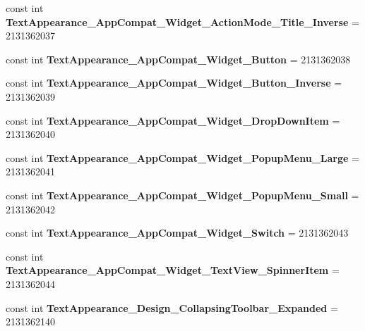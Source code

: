 \begin{DoxyCompactItemize}
const int {\bfseries Text\+Appearance\+\_\+\+App\+Compat\+\_\+\+Widget\+\_\+\+Action\+Mode\+\_\+\+Title\+\_\+\+Inverse} = 2131362037
\item 
\mbox{\label{classXaria_1_1Resource_1_1Style_a060ee91d0a7308724e62e1016d17e5c8}} 
const int {\bfseries Text\+Appearance\+\_\+\+App\+Compat\+\_\+\+Widget\+\_\+\+Button} = 2131362038
\item 
\mbox{\label{classXaria_1_1Resource_1_1Style_a6f68e5bce5f16e1d145c5e2c47e60304}} 
const int {\bfseries Text\+Appearance\+\_\+\+App\+Compat\+\_\+\+Widget\+\_\+\+Button\+\_\+\+Inverse} = 2131362039
\item 
\mbox{\label{classXaria_1_1Resource_1_1Style_afdb474a39f85c1ed8ecae8a5fab4febe}} 
const int {\bfseries Text\+Appearance\+\_\+\+App\+Compat\+\_\+\+Widget\+\_\+\+Drop\+Down\+Item} = 2131362040
\item 
\mbox{\label{classXaria_1_1Resource_1_1Style_ab780d03ea6f90f6f473100dbf3c7f823}} 
const int {\bfseries Text\+Appearance\+\_\+\+App\+Compat\+\_\+\+Widget\+\_\+\+Popup\+Menu\+\_\+\+Large} = 2131362041
\item 
\mbox{\label{classXaria_1_1Resource_1_1Style_a1ccc9e06496c54558a732987346e878d}} 
const int {\bfseries Text\+Appearance\+\_\+\+App\+Compat\+\_\+\+Widget\+\_\+\+Popup\+Menu\+\_\+\+Small} = 2131362042
\item 
\mbox{\label{classXaria_1_1Resource_1_1Style_ac2c5b2097d990652ce9f1d06637dca04}} 
const int {\bfseries Text\+Appearance\+\_\+\+App\+Compat\+\_\+\+Widget\+\_\+\+Switch} = 2131362043
\item 
\mbox{\label{classXaria_1_1Resource_1_1Style_ad43206d356f780a4d98f9cc7ef0eefa2}} 
const int {\bfseries Text\+Appearance\+\_\+\+App\+Compat\+\_\+\+Widget\+\_\+\+Text\+View\+\_\+\+Spinner\+Item} = 2131362044
\item 
\mbox{\label{classXaria_1_1Resource_1_1Style_a5b500a9a9cb181716d0095b13bd9af95}} 
const int {\bfseries Text\+Appearance\+\_\+\+Design\+\_\+\+Collapsing\+Toolbar\+\_\+\+Expanded} = 2131362140

\end{DoxyCompactItemize}
